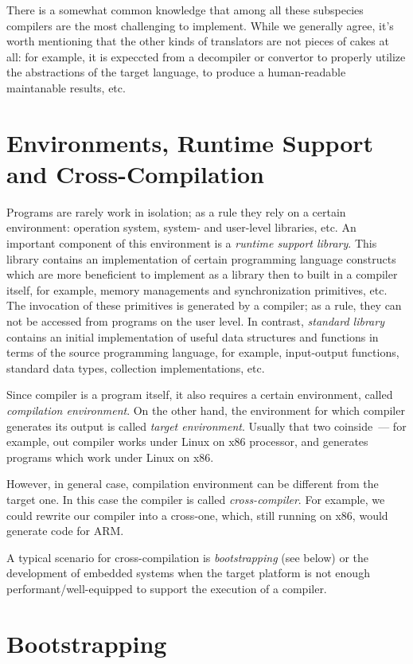 There is a somewhat common knowledge that among all these subspecies compilers are the most challenging to implement. While
we generally agree, it's worth mentioning that the other kinds of translators are not pieces of cakes at all: for example,
it is expeccted from a decompiler or convertor to properly utilize the abstractions of the target language, to produce a
human-readable maintanable results, etc.

\section{Environments, Runtime Support and Cross-Compilation}

Programs are rarely work in isolation; as a rule they rely on a certain environment: operation system, system- and user-level
libraries, etc. An important component of this environment is a \emph{runtime support library}. This library contains
an implementation of certain programming language constructs which are more beneficient to implement as a
library then to built in a compiler itself, for example, memory managements and synchronization primitives, etc. The
invocation of these primitives is generated by a compiler; as a rule, they can not be accessed from programs on the user level.
In contrast, \emph{standard library} contains an initial implementation of useful data structures and functions
in terms of the source programming language, for example, input-output functions, standard data types, collection implementations, etc.

Since compiler is a program itself, it also requires a certain environment, called \emph{compilation environment}.
On the other hand, the environment for which compiler generates its output is called \emph{target environment}. Usually that two
coinside~--- for example, out \lama compiler works under Linux on x86 processor, and generates programs which work
under Linux on x86.

However, in general case, compilation environment can be different from the target one. In this case the compiler is called
\emph{cross-compiler}. For example, we could rewrite our \lama compiler into a cross-one, which, still running on x86,
would generate code for ARM. 

A typical scenario for cross-compilation is \emph{bootstrapping} (see below) or the development of embedded systems when
the target platform is not enough performant/well-equipped to support the execution of a compiler.

\section{Bootstrapping}

